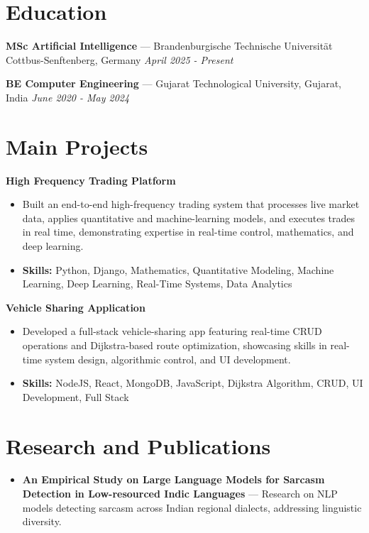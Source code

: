 \documentclass[a4paper,10pt]{article}
\begin{document}
\section*{Education}
\textbf{MSc Artificial Intelligence} — Brandenburgische Technische Universität Cottbus-Senftenberg, Germany \hfill \textit{April 2025 - Present}\par
\vspace{1.5pt}
\textbf{BE Computer Engineering} — Gujarat Technological University, Gujarat, India \hfill \textit{June 2020 - May 2024}\par

\section*{Main Projects}
\textbf{High Frequency Trading Platform}\par
\vspace{1pt}
\begin{itemize}
  \item Built an end-to-end high-frequency trading system that processes live market data, applies quantitative and machine-learning models, and executes trades in real time, demonstrating expertise in real-time control, mathematics, and deep learning.
  \item \textbf{Skills:} Python, Django, Mathematics, Quantitative Modeling, Machine Learning, Deep Learning, Real-Time Systems, Data Analytics
\end{itemize}
\vspace{3pt}
\textbf{Vehicle Sharing Application}\par
\vspace{1pt}
\begin{itemize}
  \item Developed a full-stack vehicle-sharing app featuring real-time CRUD operations and Dijkstra-based route optimization, showcasing skills in real-time system design, algorithmic control, and UI development.
  \item \textbf{Skills:} NodeJS, React, MongoDB, JavaScript, Dijkstra Algorithm, CRUD, UI Development, Full Stack
\end{itemize}

\section*{Research and Publications}
\begin{itemize}
\item \textbf{An Empirical Study on Large Language Models for Sarcasm Detection in Low-resourced Indic Languages} — Research on NLP models detecting sarcasm across Indian regional dialects, addressing linguistic diversity.
\end{itemize}
\end{document}
